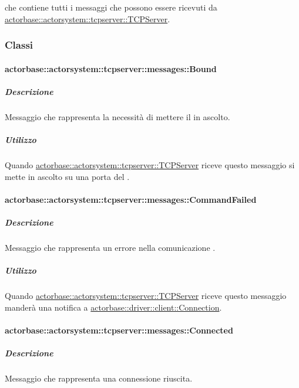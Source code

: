 \documentclass{scalatekids-article}
\begin{document}
 che contiene tutti i messaggi che possono essere ricevuti da
\hyperref[sec:actorbase::actorsystem::tcpserver::TCPServer]{actorbase::actorsystem::tcpserver::TCPServer}.

\subsubsection{Classi}

\paragraph{actorbase::actorsystem::tcpserver::messages::Bound}
\label{sec:actorbase::actorsystem::tcpserver::messages::Bound}

\subparagraph{Descrizione}

Messaggio che rappresenta la necessità di mettere il  in ascolto.

\subparagraph{Utilizzo}

Quando \hyperref[sec:actorbase::actorsystem::tcpserver::TCPServer]{actorbase::actorsystem::tcpserver::TCPServer}
riceve questo messaggio si mette in ascolto su una porta del .

\paragraph{actorbase::actorsystem::tcpserver::messages::CommandFailed}
\label{sec:actorbase::actorsystem::tcpserver::messages::CommandFailed}

\subparagraph{Descrizione}

Messaggio che rappresenta un errore nella comunicazione .

\subparagraph{Utilizzo}

Quando \hyperref[sec:actorbase::actorsystem::tcpserver::TCPServer]{actorbase::actorsystem::tcpserver::TCPServer}
riceve questo messaggio manderà una notifica a
\hyperref[sec:actorbase::driver::client::Connection]{actorbase::driver::client::Connection}.

\paragraph{actorbase::actorsystem::tcpserver::messages::Connected}
\label{sec:actorbase::actorsystem::tcpserver::messages::Connected}

\subparagraph{Descrizione}

Messaggio che rappresenta una connessione  riuscita.
\end{document}
